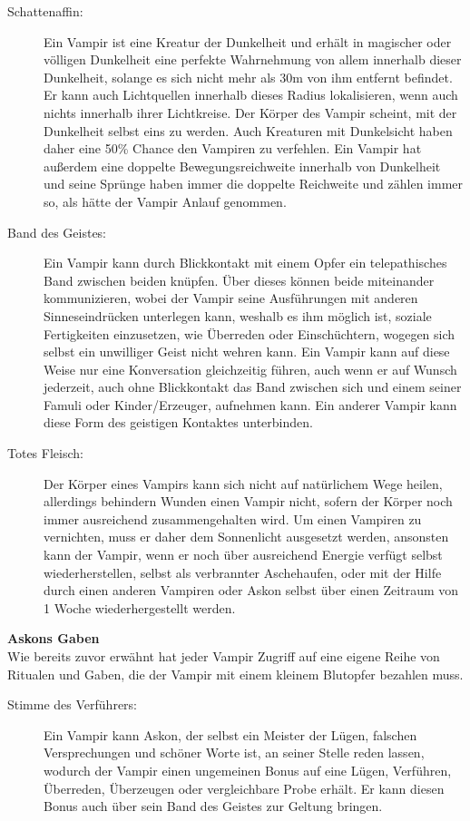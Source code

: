 \documentclass[a4paper,12pt,oneside]{book}
\begin{document}
\begin{description}
\begin{description}
\item[Schattenaffin:]
Ein Vampir ist eine Kreatur der Dunkelheit und erhält in magischer oder völligen Dunkelheit eine perfekte Wahrnehmung von allem innerhalb dieser Dunkelheit, solange es sich nicht mehr als 30m von ihm entfernt befindet. Er kann auch Lichtquellen innerhalb dieses Radius lokalisieren, wenn auch nichts innerhalb ihrer Lichtkreise. Der Körper des Vampir scheint, mit der Dunkelheit selbst eins zu werden. Auch Kreaturen mit Dunkelsicht haben daher eine 50\% Chance den Vampiren zu verfehlen. Ein Vampir hat außerdem eine doppelte Bewegungsreichweite innerhalb von Dunkelheit und seine Sprünge haben immer die doppelte Reichweite und zählen immer so, als hätte der Vampir Anlauf genommen.
\item[Band des Geistes:]
Ein Vampir kann durch Blickkontakt mit einem Opfer ein telepathisches Band zwischen beiden knüpfen. Über dieses können beide miteinander kommunizieren, wobei der Vampir seine Ausführungen mit anderen Sinneseindrücken unterlegen kann, weshalb es ihm möglich ist, soziale Fertigkeiten einzusetzen, wie Überreden oder Einschüchtern, wogegen sich selbst ein unwilliger Geist nicht wehren kann. Ein Vampir kann auf diese Weise nur eine Konversation gleichzeitig führen, auch wenn er auf Wunsch jederzeit, auch ohne Blickkontakt das Band zwischen sich und einem seiner Famuli oder Kinder/Erzeuger, aufnehmen kann. Ein anderer Vampir kann diese Form des geistigen Kontaktes unterbinden. 
\item[Totes Fleisch:]
Der Körper eines Vampirs kann sich nicht auf natürlichem Wege heilen, allerdings behindern Wunden einen Vampir nicht, sofern der Körper noch immer ausreichend zusammengehalten wird. Um einen Vampiren zu vernichten, muss er daher dem Sonnenlicht ausgesetzt werden, ansonsten kann der Vampir, wenn er noch über ausreichend Energie verfügt selbst wiederherstellen, selbst als verbrannter Aschehaufen, oder mit der Hilfe durch einen anderen Vampiren oder Askon selbst über einen Zeitraum von 1 Woche wiederhergestellt werden.
\end{description}
\textbf{Askons Gaben}\label{Vampire:AskonGaben}
\\Wie bereits zuvor erwähnt hat jeder Vampir Zugriff auf eine eigene Reihe von Ritualen und Gaben, die der Vampir mit einem kleinem Blutopfer bezahlen muss.
\begin{description}
\item[Stimme des Verführers:]
Ein Vampir kann Askon, der selbst ein Meister der Lügen, falschen Versprechungen und schöner Worte ist, an seiner Stelle reden lassen, wodurch der Vampir einen ungemeinen Bonus auf eine Lügen, Verführen, Überreden, Überzeugen oder vergleichbare Probe erhält. Er kann diesen Bonus auch über sein Band des Geistes zur Geltung bringen.

\end{description}
\end{description}
\end{document}
